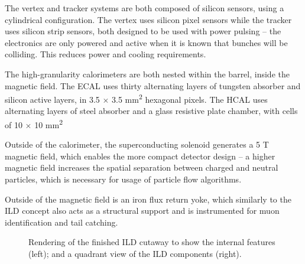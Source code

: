 The vertex and tracker systems are both composed of silicon sensors, using a cylindrical configuration. The vertex uses silicon pixel sensors while the tracker uses silicon strip sensors, both designed to be used with power pulsing -- the electronics are only powered and active when it is known that bunches will be colliding. This reduces power and cooling requirements. 

The high-granularity calorimeters are both nested within the barrel, inside the magnetic field. The \acrshort{ECAL} uses thirty alternating layers of tungsten absorber and silicon active layers, in 3.5 $\times$ 3.5 mm\textsuperscript{2} hexagonal pixels. The \acrshort{HCAL} uses alternating layers of steel absorber and a glass resistive plate chamber, with cells of 10 $\times$ 10 mm\textsuperscript{2}

Outside of the calorimeter, the superconducting solenoid generates a 5 T magnetic field, which enables the more compact detector design -- a higher magnetic field increases the spatial separation between charged and neutral particles, which is necessary for usage of particle flow algorithms.

Outside of the magnetic field is an iron flux return yoke, which similarly to the \acrshort{ILD} concept also acts as a structural support and is instrumented for muon identification and tail catching. 

\begin{figure}[p]%
	\centering
    \qquad
    \caption{Rendering of the finished \acrshort{ILD} cutaway to show the internal features (left); and a quadrant view of the \acrshort{ILD} components (right).}%
    \label{figure:colliders/ILD/double}%
\end{figure}

